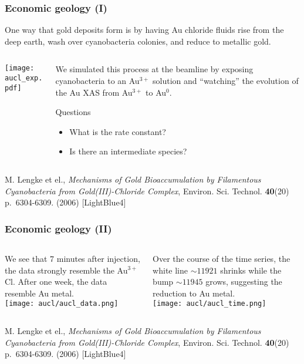 \begin{frame}
  \frametitle{Economic geology (I)}

  One way that gold deposits form is by having Au chloride fluids rise
  from the deep earth, wash over cyanobacteria colonies, and reduce to
  metallic gold.

  \begin{columns}
    \begin{column}{0.5\linewidth}
      \texttt{[image: aucl\_exp.pdf]}
    \end{column}
    \begin{column}{0.5\linewidth}
      We simulated this process at the beamline by exposing
      cyanobacteria to an Au$^{3+}$ solution and ``watching'' the
      evolution of the Au XAS from Au$^{3+}$ to Au$^0$.
      \begin{block}{Questions}
        \begin{itemize}
        \item What is the rate constant?
        \item Is there an intermediate species?
        \end{itemize}
      \end{block}
    \end{column}
  \end{columns}

  \begin{bottomnote}[0.52][19]
    M. Lengke et el., \textit{Mechanisms of Gold Bioaccumulation by
      Filamentous Cyanobacteria from Gold(III)-Chloride Complex},
    Environ. Sci. Technol. \textbf{40}(20) p.~6304-6309. (2006)
    [LightBlue4]
  \end{bottomnote}
\end{frame}
\begin{frame}
  \frametitle{Economic geology (II)}

  \begin{columns}
    \begin{column}{0.5\linewidth}
      We see that \alert{7 minutes} after injection, the data strongly
      resemble the {\color{Blue3}Au$^{3+}$Cl}.  After
      {\color{Purple4}one week}, the data resemble
      {\color{Green4}Au metal}.\\[1ex]
      \texttt{[image: aucl/aucl\_data.png]}
    \end{column}
    \begin{column}{0.5\linewidth}
      Over the course of the time series, the white line $\sim11921$
      shrinks while the bump $\sim11945$ grows, suggesting the
      reduction to Au metal.\\[1ex]
      \texttt{[image: aucl/aucl\_time.png]}
    \end{column}
  \end{columns}

  \begin{bottomnote}[0.52][19]
    M. Lengke et el., \textit{Mechanisms of Gold Bioaccumulation by
      Filamentous Cyanobacteria from Gold(III)-Chloride Complex},
    Environ. Sci. Technol. \textbf{40}(20) p.~6304-6309. (2006)
    [LightBlue4]
  \end{bottomnote}
\end{frame}
